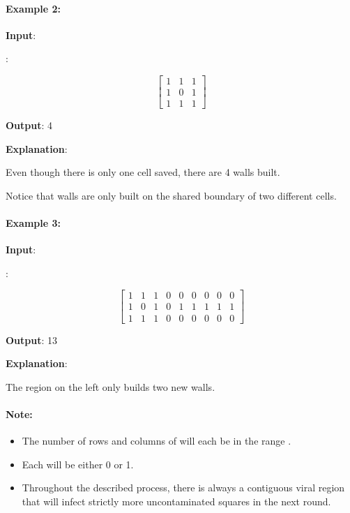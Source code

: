\paragraph{Example 2:}

\begin{flushleft}
\textbf{Input}: 

:

\[
\begin{bmatrix}
1 & 1 & 1\\
1 & 0 & 1\\
1 & 1 & 1
\end{bmatrix}
\]

\textbf{Output}: 4

\textbf{Explanation}: 

Even though there is only one cell saved, there are 4 walls built.

Notice that walls are only built on the shared boundary of two different cells.
\end{flushleft}

\paragraph{Example 3:}

\begin{flushleft}
\textbf{Input}: 

:

\[
\begin{bmatrix}
1 & 1 & 1 & 0 & 0 & 0 & 0 & 0 & 0\\ 
1 & 0 & 1 & 0 & 1 & 1 & 1 & 1 & 1\\
1 & 1 & 1 & 0 & 0 & 0 & 0 & 0 & 0
\end{bmatrix}
\]

\textbf{Output}: 13

\textbf{Explanation}: 

The region on the left only builds two new walls.
\end{flushleft}

\paragraph{Note:}

\begin{itemize}
\item The number of rows and columns of  will each be in the range \fcj{[1, 50]}.
\item Each  will be either 0 or 1.
\item Throughout the described process, there is always a contiguous viral region that will infect strictly more uncontaminated squares in the next round.
\end{itemize}